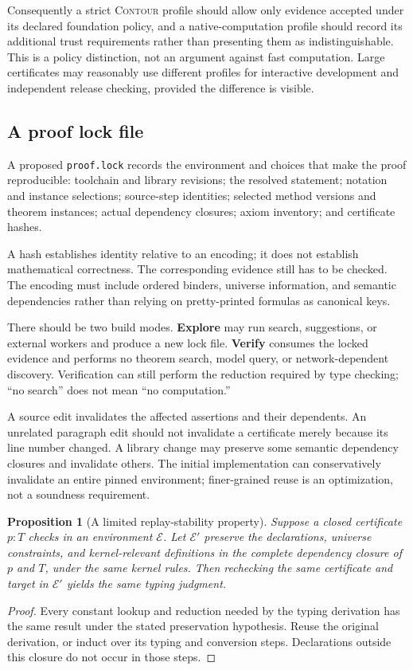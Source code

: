 \documentclass[11pt,a4paper]{article}
\newtheorem{proposition}[theorem]{Proposition}
\newcommand{\EE}{\mathcal E}
\newcommand{\codeid}[1]{\nolinkurl{#1}}
\newcommand{\contour}{\textsc{Contour}}
\begin{document}
Consequently a strict \contour{} profile should allow only evidence accepted under its declared foundation policy, and a native-computation profile should record its additional trust requirements rather than presenting them as indistinguishable. This is a policy distinction, not an argument against fast computation. Large certificates may reasonably use different profiles for interactive development and independent release checking, provided the difference is visible.

\subsection{A proof lock file}

A proposed \codeid{proof.lock} records the environment and choices that make the proof reproducible: toolchain and library revisions; the resolved statement; notation and instance selections; source-step identities; selected method versions and theorem instances; actual dependency closures; axiom inventory; and certificate hashes.

A hash establishes identity relative to an encoding; it does not establish mathematical correctness. The corresponding evidence still has to be checked. The encoding must include ordered binders, universe information, and semantic dependencies rather than relying on pretty-printed formulas as canonical keys.

There should be two build modes. \textbf{Explore} may run search, suggestions, or external workers and produce a new lock file. \textbf{Verify} consumes the locked evidence and performs no theorem search, model query, or network-dependent discovery. Verification can still perform the reduction required by type checking; ``no search'' does not mean ``no computation.''

A source edit invalidates the affected assertions and their dependents. An unrelated paragraph edit should not invalidate a certificate merely because its line number changed. A library change may preserve some semantic dependency closures and invalidate others. The initial implementation can conservatively invalidate an entire pinned environment; finer-grained reuse is an optimization, not a soundness requirement.

\begin{proposition}[A limited replay-stability property]
Suppose a closed certificate $p:T$ checks in an environment $\EE$. Let $\EE'$ preserve the declarations, universe constraints, and kernel-relevant definitions in the complete dependency closure of $p$ and $T$, under the same kernel rules. Then rechecking the same certificate and target in $\EE'$ yields the same typing judgment.
\end{proposition}
\begin{proof}
Every constant lookup and reduction needed by the typing derivation has the same result under the stated preservation hypothesis. Reuse the original derivation, or induct over its typing and conversion steps. Declarations outside this closure do not occur in those steps.
\end{proof}
\end{document}
